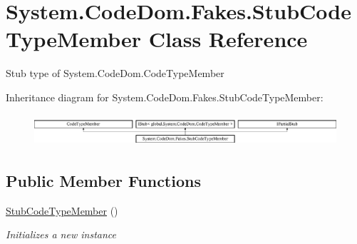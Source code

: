 \hypertarget{class_system_1_1_code_dom_1_1_fakes_1_1_stub_code_type_member}{\section{System.\-Code\-Dom.\-Fakes.\-Stub\-Code\-Type\-Member Class Reference}
\label{class_system_1_1_code_dom_1_1_fakes_1_1_stub_code_type_member}
}


Stub type of System.\-Code\-Dom.\-Code\-Type\-Member 


Inheritance diagram for System.\-Code\-Dom.\-Fakes.\-Stub\-Code\-Type\-Member\-:\begin{figure}[H]
\begin{center}
\leavevmode
\includegraphics[height=1.177708cm]{class_system_1_1_code_dom_1_1_fakes_1_1_stub_code_type_member}
\end{center}
\end{figure}
\subsection*{Public Member Functions}
\begin{DoxyCompactItemize}
\item 
\hyperlink{class_system_1_1_code_dom_1_1_fakes_1_1_stub_code_type_member_a8d8e6d2ffb74b875313e96f517044e60}{Stub\-Code\-Type\-Member} ()
\begin{DoxyCompactList}\small\item\em Initializes a new instance\end{DoxyCompactList}\end{DoxyCompactItemize}

